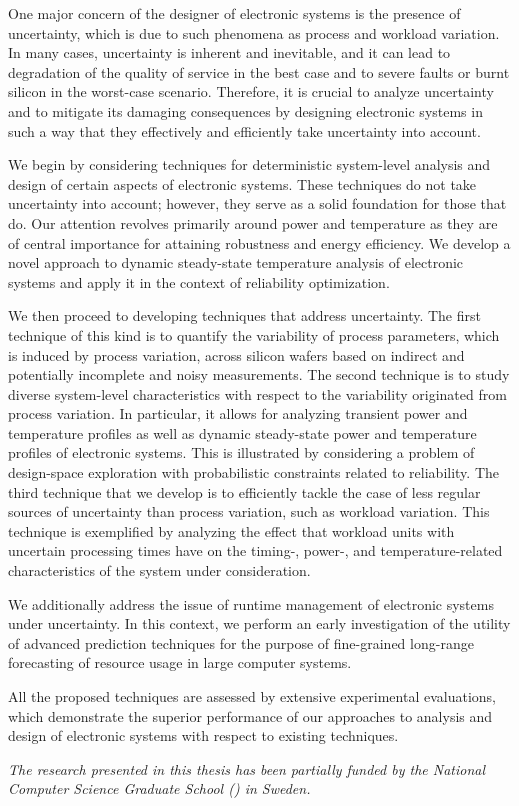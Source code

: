 One major concern of the designer of electronic systems is the presence of
uncertainty, which is due to such phenomena as process and workload variation.
In many cases, uncertainty is inherent and inevitable, and it can lead to
degradation of the quality of service in the best case and to severe faults or
burnt silicon in the worst-case scenario. Therefore, it is crucial to analyze
uncertainty and to mitigate its damaging consequences by designing electronic
systems in such a way that they effectively and efficiently take uncertainty
into account.

We begin by considering techniques for deterministic system-level analysis and
design of certain aspects of electronic systems. These techniques do not take
uncertainty into account; however, they serve as a solid foundation for those
that do. Our attention revolves primarily around power and temperature as they
are of central importance for attaining robustness and energy efficiency. We
develop a novel approach to dynamic steady-state temperature analysis of
electronic systems and apply it in the context of reliability optimization.

We then proceed to developing techniques that address uncertainty. The first
technique of this kind is to quantify the variability of process parameters,
which is induced by process variation, across silicon wafers based on indirect
and potentially incomplete and noisy measurements. The second technique is to
study diverse system-level characteristics with respect to the variability
originated from process variation. In particular, it allows for analyzing
transient power and temperature profiles as well as dynamic steady-state power
and temperature profiles of electronic systems. This is illustrated by
considering a problem of design-space exploration with probabilistic constraints
related to reliability. The third technique that we develop is to efficiently
tackle the case of less regular sources of uncertainty than process variation,
such as workload variation. This technique is exemplified by analyzing the
effect that workload units with uncertain processing times have on the timing-,
power-, and temperature-related characteristics of the system under
consideration.

We additionally address the issue of runtime management of electronic systems
under uncertainty. In this context, we perform an early investigation of the
utility of advanced prediction techniques for the purpose of fine-grained
long-range forecasting of resource usage in large computer systems.

All the proposed techniques are assessed by extensive experimental evaluations,
which demonstrate the superior performance of our approaches to analysis and
design of electronic systems with respect to existing techniques.

\vspace{1em}
\noindent
\emph{
  The research presented in this thesis has been partially funded by the
  National Computer Science Graduate School () in Sweden.
}
